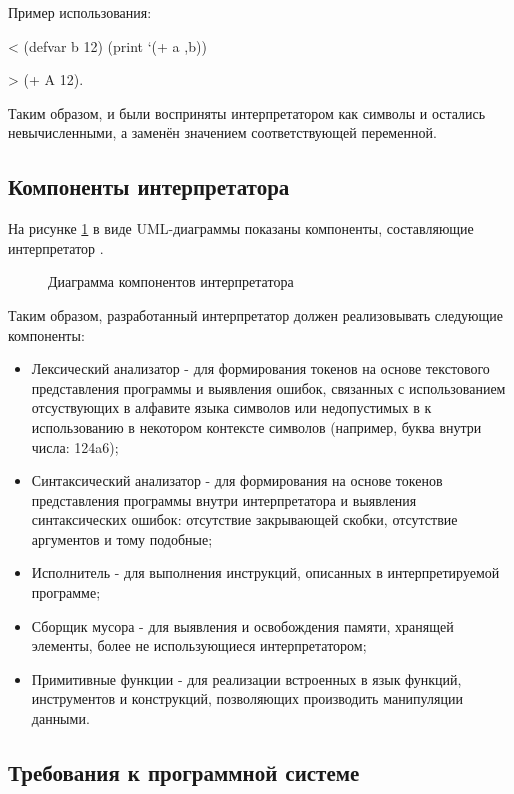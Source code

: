 Пример использования:

< (defvar b 12) (print `(+ a ,b))

> (+ A 12).

Таким образом, \quotes{+} и  были восприняты интерпретатором как символы и остались невычисленными, а  заменён значением соответствующей переменной.

\subsection{Компоненты интерпретатора}

На рисунке \ref{kompdiagram:image} в виде UML-диаграммы показаны компоненты, составляющие интерпретатор \cite{e26}.

\begin{figure}[ht]
	\caption{Диаграмма компонентов интерпретатора}
	\label{kompdiagram:image}
\end{figure}

Таким образом, разработанный интерпретатор должен реализовывать следующие компоненты:
\begin{itemize}
	\item Лексический анализатор - для формирования токенов на основе текстового представления программы и выявления ошибок, связанных с использованием отсуствующих в алфавите языка символов или недопустимых в к использованию в некотором контексте символов (например, буква внутри числа: 124a6);
	\item Синтаксический анализатор - для формирования на основе токенов представления программы внутри интерпретатора и выявления синтаксических ошибок: отсутствие закрывающей скобки, отсутствие аргументов и тому подобные;
	\item Исполнитель - для выполнения инструкций, описанных в интерпретируемой программе;
	\item Сборщик мусора - для выявления и освобождения памяти, хранящей элементы, более не использующиеся интерпретатором;
	\item Примитивные функции - для реализации встроенных в язык функций, инструментов и конструкций, позволяющих производить манипуляции данными.
\end{itemize}


\subsection{Требования к программной системе}

